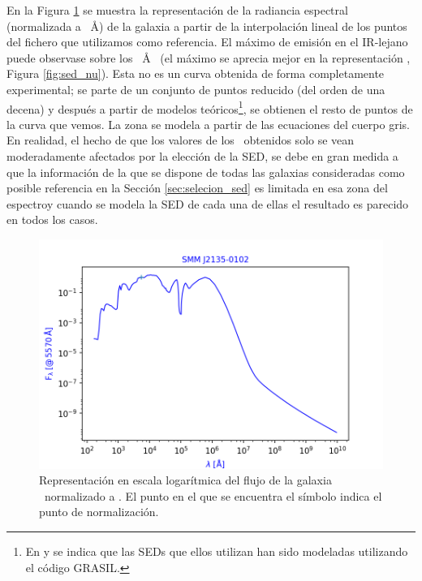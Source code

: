 En la Figura \ref{fig:sed_lambda} se muestra la representación de la radiancia espectral (normalizada a ~\AA)  de la galaxia a partir de la interpolación lineal de los puntos del fichero que utilizamos como referencia. 
El máximo de emisión en el IR-lejano puede observase sobre los ~\AA~ (el máximo se aprecia mejor en la representación , Figura \ref{fig:sed_nu}).
Esta no es un curva obtenida de forma completamente experimental; se parte de un conjunto de puntos reducido (del orden de una decena) y después a partir de modelos teóricos\footnote{En \cite{article:Nuevo_2012} y \cite{article:Lapi_2011} se indica que las SEDs que ellos utilizan han sido modeladas utilizando el código GRASIL.}, se obtienen el resto de puntos de la curva que vemos. La zona  se modela a partir de las ecuaciones del cuerpo gris.
En realidad, el hecho de que los valores de los \rts\ obtenidos solo se vean moderadamente afectados por la elección de la SED, se debe en gran medida a que la información de la que se dispone de todas las galaxias consideradas como posible referencia en la Sección \ref{sec:selecion_sed} es limitada en esa zona del espectro\linebreak y cuando se modela la SED de cada una de ellas el resultado es parecido en todos los casos.

\begin{figure}[htb]
    \begin{center}
         \includegraphics[width=14cm]{3_Redshift_Hatlas/grafica_SMM_F_lambda.png}
    \end{center}
    \vspace{-5mm}
    \caption{\small Representación en escala logarítmica del flujo  de la galaxia \smm\ normalizado a . El punto en el que se encuentra el símbolo \maths{+} indica el punto de normalización.}
    \label{fig:sed_lambda}
\end{figure}

